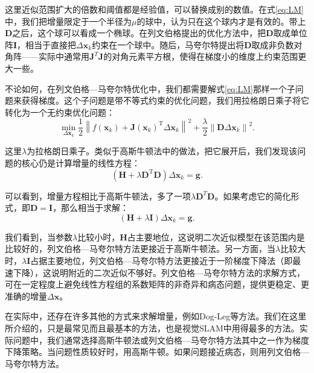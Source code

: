 这里近似范围扩大的倍数和阈值都是经验值，可以替换成别的数值。在式\eqref{eq:LM}中，我们把增量限定于一个半径为$\mu$的球中，认为只在这个球内才是有效的。带上$\bm{D}$之后，这个球可以看成一个椭球。在列文伯格提出的优化方法中，把$\bm{D}$取成单位阵$\bm{I}$，相当于直接把$\Delta \bm{x}_k$约束在一个球中。随后，马夸尔特提出将$\bm{D}$取成非负数对角阵——实际中通常用$\bm{J}^T \bm{J}$的对角元素平方根，使得在梯度小的维度上约束范围更大一些。


不论如何，在列文伯格—马夸尔特优化中，我们都需要解式\eqref{eq:LM}那样一个子问题来获得梯度。这个子问题是带不等式约束的优化问题，我们用拉格朗日乘子将它转化为一个无约束优化问题：
\begin{equation}
\mathop {\min }\limits_{\Delta \bm{x}_k} \frac{1}{2} {\left\| {f\left( \bm{x}_k \right) + \bm{J} \left( \bm{x}_k \right)^\mathrm{T} \Delta \bm{x}_k} \right\|^2} + \frac{\lambda}{2} \left\| \bm{D} \Delta \bm{x}_k \right\|^2 .
\end{equation}

这里$\lambda$为拉格朗日乘子。类似于高斯牛顿法中的做法，把它展开后，我们发现该问题的核心仍是计算增量的线性方程：
\begin{equation}
\left( \bm{H} +\lambda \bm{D}^\mathrm{T} \bm{D} \right) \Delta \bm{x}_k = \bm{g}.
\end{equation}

可以看到，增量方程相比于高斯牛顿法，多了一项$\lambda \bm{D}^T \bm{D}$。如果考虑它的简化形式，即$\bm{D}=\bm{I}$，那么相当于求解：
\begin{displaymath}
\left( \bm{H} +\lambda \bm{I} \right) \Delta \bm{x}_k = \bm{g}.
\end{displaymath}

我们看到，当参数$\lambda$比较小时，$\bm{H}$占主要地位，这说明二次近似模型在该范围内是比较好的，列文伯格—马夸尔特方法更接近于高斯牛顿法。另一方面，当$\lambda$比较大时，$\lambda \bm{I}$占据主要地位，列文伯格—马夸尔特方法更接近于一阶梯度下降法（即最速下降），这说明附近的二次近似不够好。列文伯格—马夸尔特方法的求解方式，可在一定程度上避免线性方程组的系数矩阵的非奇异和病态问题，提供更稳定、更准确的增量$\Delta \bm{x}$。

在实际中，还存在许多其他的方式来求解增量，例如Dog-Leg\cite{Nocedal2006}等方法。我们在这里所介绍的，只是最常见而且最基本的方法，也是视觉SLAM中用得最多的方法。实际问题中，我们通常选择高斯牛顿法或列文伯格—马夸尔特方法其中之一作为梯度下降策略。当问题性质较好时，用高斯牛顿。如果问题接近病态，则用列文伯格—马夸尔特方法。

